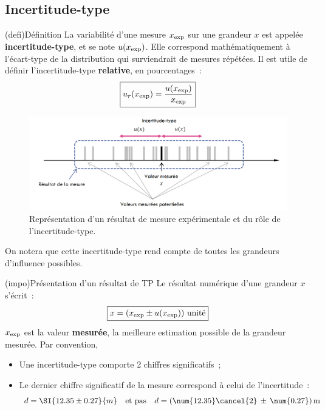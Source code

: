 \documentclass[../main/main.tex]{subfiles}
\begin{document}
\subsection{Incertitude-type}
\begin{tcb}[sidebyside, righthand ratio=.3](defi){Définition}
	La variabilité d'une mesure $x_{\rm exp}$ sur une grandeur $x$ est appelée
	\textbf{incertitude-type}, et se note $u(x_{\rm exp})$. Elle correspond
	mathématiquement à l'écart-type de la distribution qui surviendrait de mesures
	répétées.
	\tcblower
	Il est utile de définir l'incertitude-type \textbf{relative}, en
	pourcentages~:
	\[
		\boxed{u_r(x_{\rm exp}) = \frac{u(x_{\rm exp})}{x_{\rm exp}}}
	\]
\end{tcb}
\begin{figure}[htbp]
	\centering
	\includegraphics[scale=1]{inctype}
	\caption{Représentation d'un résultat de mesure expérimentale et du rôle de
		l'incertitude-type.}
	\label{fig:inctype}
\end{figure}
On notera que cette incertitude-type rend compte de toutes les grandeurs
d'influence possibles.

\begin{tcb}[sidebyside, lefthand ratio=.4](impo){Présentation d'un résultat de
			TP}
	Le résultat numérique d'une grandeur $x$ s'écrit~:
	\[
		\boxed{x = \left(x_{\rm exp} \pm u(x_{\rm exp})\right) \, \text{unité}}
	\]
	$x_{\rm exp}$ est la valeur \textbf{mesurée}, la meilleure estimation possible
	de la grandeur mesurée.
	\tcblower
	Par convention,
	\begin{itemize}[label=$\diamond$, leftmargin=10pt]
		\item Une incertitude-type comporte 2 chiffres significatifs~;
		\item Le dernier chiffre significatif de la mesure correspond à celui de
		      l'incertitude~:
		      \[
			      d = \SI{12.35\pm0.27}{m}
			      \quad \text{et pas} \quad
			      d = (\num{12.35}\cancel{2}\,\pm\,\num{0.27})\,\rm  m
		      \]
	\end{itemize}
\end{tcb}
\end{document}
